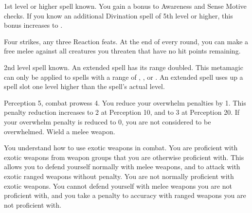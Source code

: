 \featpre 1st level or higher  spell known.
\featben You gain a  bonus to Awareness and Sense Motive checks.
If you know an additional Divination spell of 5th level or higher, this bonus increases to .

\featpres Four strikes, any three Reaction feats.
\featben At the end of every round, you can make a free melee  against all creatures you threaten that have no hit points remaining.

\featpre 2nd level spell known.
\featben An extended spell has its range doubled.
This metamagic can only be applied to spells with a range of \rngclose, \rngmed, or \rnglong.
An extended spell uses up a spell slot one level higher than the spell's actual level.

\featpre Perception 5, combat prowess 4.
\featben You reduce your overwhelm penalties by 1.
This penalty reduction increases to 2 at Perception 10, and to 3 at Perception 20.
If your overwhelm penalty is reduced to 0, you are not considered to be overwhelmed.
\featpre Wield a melee weapon.

You understand how to use exotic weapons in combat.
\featben You are proficient with exotic weapons from weapon groups that you are otherwise proficient with.
This allows you to defend yourself normally with melee weapons, and to attack with exotic ranged weapons without penalty.
You are not normally proficient with exotic weapons.
You cannot defend yourself with melee weapons you are not proficient with, and you take a  penalty to accuracy with ranged weapons you are not proficient with.

